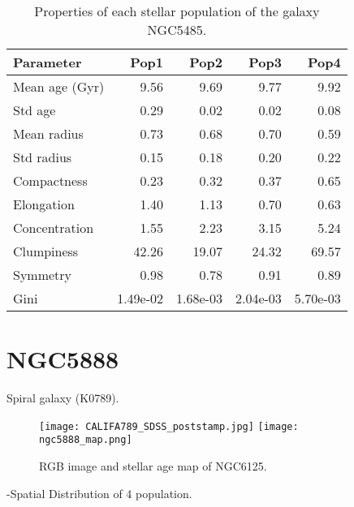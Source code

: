 \begin{table}[h]
\centering
\begin{tabular}{l|r|r|r|r}
Parameter & Pop1 & Pop2 & Pop3 & Pop4 \\\hline
Mean age (Gyr) & 9.56 & 9.69 & 9.77 & 9.92\\
Std age & 0.29 & 0.02 & 0.02 & 0.08 \\
Mean radius & 0.73 & 0.68 & 0.70 & 0.59 \\
Std radius & 0.15 & 0.18 & 0.20 & 0.22 \\
Compactness & 0.23 & 0.32 & 0.37 & 0.65 \\
Elongation & 1.40 & 1.13 & 0.70 & 0.63 \\
Concentration & 1.55 & 2.23 & 3.15 & 5.24  \\
Clumpiness & 42.26 & 19.07 & 24.32 & 69.57 \\
Symmetry & 0.98 & 0.78 & 0.91 & 0.89 \\
Gini & 1.49e-02 & 1.68e-03 & 2.04e-03 & 5.70e-03 \\
\end{tabular}
\caption{\label{tab:widgets}Properties of each stellar population of the galaxy NGC5485.}
\end{table}


\newpage
\section*{NGC5888}
Spiral galaxy (K0789).

\begin{figure}[bh]
\begin{center}
\texttt{[image: CALIFA789\_SDSS\_poststamp.jpg]}
\texttt{[image: ngc5888\_map.png]}
\caption{RGB image and stellar age map of NGC6125.}
   \label{fig1}
\end{center}
\end{figure}

-Spatial Distribution of 4 population.



